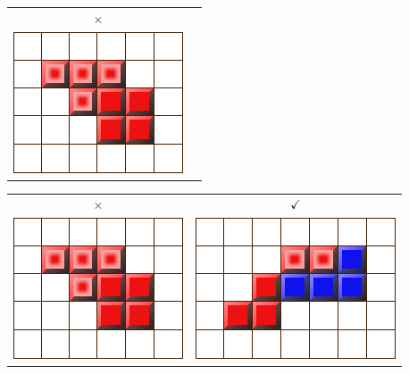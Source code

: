 \documentclass[12pt, draft]{beamer}
\begin{document}
\begin{frame}
\begin{tabular}{c c}
	\huge \color{red} $\times$ & \\
	\includegraphics[width=0.5\linewidth]{media/how2play4.png}
	&
\end{tabular}
\end{frame}
\begin{frame}
\begin{tabular}{c c}
	\huge \color{red} $\times$ & \huge \color{green} $\checkmark$\\
	\includegraphics[width=0.5\linewidth]{media/how2play4.png}
	&
	\includegraphics[width=0.5\linewidth]{media/how2play5.png}
\end{tabular}
\end{frame}
\end{document}
